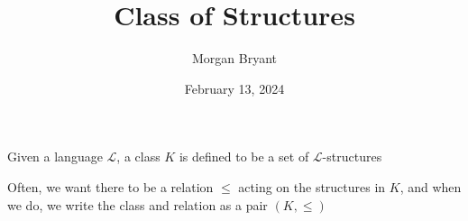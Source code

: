 \documentclass[a4paper]{article}
\title{Class of Structures}
\date{February 13, 2024}
\author{Morgan Bryant}
\begin{document}
\maketitle
\par{Given a language \(\mathcal {L}\), a class \(K\) is defined to be a set of \(\mathcal {L}\)-structures}\par{Often, we want there to be a relation \(\leq\) acting on the structures in \(K\), and when we do, we write the class and relation as a pair \((K,  \leq )\)}
\printbibliography
\end{document}
